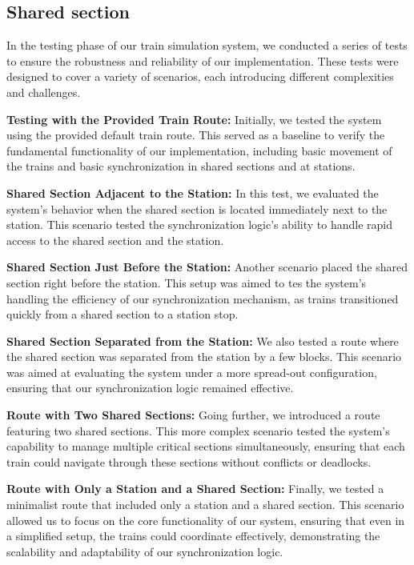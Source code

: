 \documentclass{article}
\begin{document}
    \subsection*{Shared section}
    In the testing phase of our train simulation system, we conducted a series of tests to ensure the robustness and reliability of our implementation. These tests were designed to cover a variety of scenarios, each introducing different complexities and challenges.

    \textbf{Testing with the Provided Train Route:} Initially, we tested the system using the provided default train route. This served as a baseline to verify the fundamental functionality of our implementation, including basic movement of the trains and basic synchronization in shared sections and at stations.

    \textbf{Shared Section Adjacent to the Station:} In this test, we evaluated the system's behavior when the shared section is located immediately next to the station. This scenario tested the synchronization logic's ability to handle rapid access to the shared section and the station.

    \textbf{Shared Section Just Before the Station:} Another scenario placed the shared section right before the station. This setup was aimed to tes the system's handling the efficiency of our synchronization mechanism, as trains transitioned quickly from a shared section to a station stop.

    \textbf{Shared Section Separated from the Station:} We also tested a route where the shared section was separated from the station by a few blocks. This scenario was aimed at evaluating the system under a more spread-out configuration, ensuring that our synchronization logic remained effective.

    \textbf{Route with Two Shared Sections:} Going further, we introduced a route featuring two shared sections. This more complex scenario tested the system's capability to manage multiple critical sections simultaneously, ensuring that each train could navigate through these sections without conflicts or deadlocks.

    \textbf{Route with Only a Station and a Shared Section:} Finally, we tested a minimalist route that included only a station and a shared section. This scenario allowed us to focus on the core functionality of our system, ensuring that even in a simplified setup, the trains could coordinate effectively, demonstrating the scalability and adaptability of our synchronization logic.
\end{document}
